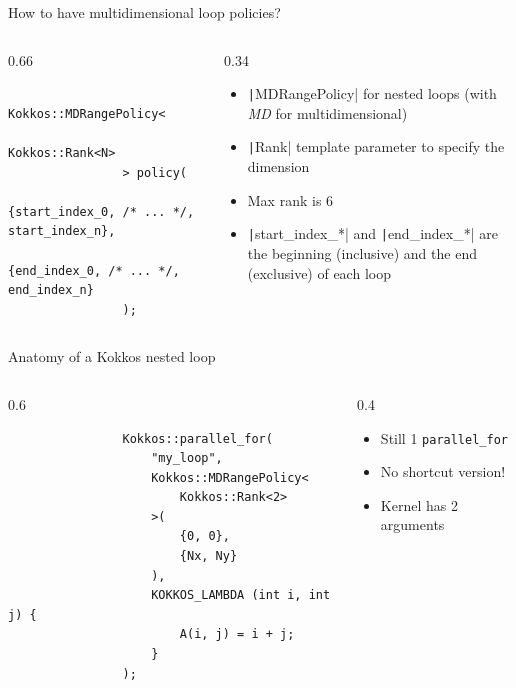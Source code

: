 \documentclass[
    aspectratio=169,
]{beamer}
\begin{document}
\begin{frame}[fragile]{How to have multidimensional loop policies?}
    \begin{columns}
        \begin{column}{0.66\linewidth}
            \begin{verbatim}
                Kokkos::MDRangePolicy<
                    Kokkos::Rank<N>
                > policy(
                    {start_index_0, /* ... */, start_index_n},
                    {end_index_0, /* ... */, end_index_n}
                );
            \end{verbatim}
        \end{column}
        \begin{column}{0.34\linewidth}
            \begin{itemize}
                \item \texttt|MDRangePolicy| for nested loops (with \emph{MD} for multidimensional)
                \item \texttt|Rank| template parameter to specify the dimension
                \item Max rank is 6
                \item \texttt|start_index_*| and \texttt|end_index_*| are the beginning (inclusive) and the end (exclusive) of each loop
            \end{itemize}
        \end{column}
    \end{columns}
\end{frame}

\begin{frame}[fragile]{Anatomy of a Kokkos nested loop}
    \begin{columns}
        \begin{column}{0.6\linewidth}
            \begin{verbatim}
                Kokkos::parallel_for(
                    "my_loop",
                    Kokkos::MDRangePolicy<
                        Kokkos::Rank<2>
                    >(
                        {0, 0},
                        {Nx, Ny}
                    ),
                    KOKKOS_LAMBDA (int i, int j) {
                        A(i, j) = i + j;
                    }
                );
            \end{verbatim}
        \end{column}
        \begin{column}{0.4\linewidth}
            \begin{itemize}
                \item Still 1 \texttt{parallel\_for}
                \item No shortcut version!
                \item Kernel has 2 arguments
            \end{itemize}
        \end{column}
    \end{columns}
\end{frame}
\end{document}
